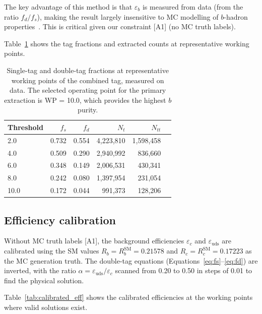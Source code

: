 \documentclass[11pt,a4paper]{article}
\begin{document}
The key advantage of this method is that $\varepsilon_b$ is measured from data (from
the ratio $f_d / f_s$), making the result largely insensitive to MC modelling of
$b$-hadron properties~\cite{ALEPH:Rb:1996, LEP:HF:2001}. This is critical given
our constraint [A1] (no MC truth labels).

Table~\ref{tab:working_points} shows the tag fractions and extracted counts at
representative working points.

\begin{table}[htbp]
\centering
\caption{Single-tag and double-tag fractions at representative working points of
the combined tag, measured on data. The selected operating point for the primary
extraction is WP = 10.0, which provides the highest $b$ purity.}
\label{tab:working_points}
\begin{tabular}{lrrrrr}
\toprule
Threshold & $f_s$ & $f_d$ & $N_t$ & $N_{tt}$ \\
\midrule
2.0 & 0.732 & 0.554 & 4,223,810 & 1,598,458 \\
4.0 & 0.509 & 0.290 & 2,940,992 & 836,660 \\
6.0 & 0.348 & 0.149 & 2,006,531 & 430,341 \\
8.0 & 0.242 & 0.080 & 1,397,954 & 231,054 \\
10.0 & 0.172 & 0.044 & 991,373 & 128,206 \\
\bottomrule
\end{tabular}
\end{table}

\subsection{Efficiency calibration}
\label{sec:calibration}

Without MC truth labels [A1], the background efficiencies $\varepsilon_c$ and
$\varepsilon_\mathrm{uds}$ are calibrated using the SM values $R_b = R_b^\mathrm{SM} = 0.21578$
and $R_c = R_c^\mathrm{SM} = 0.17223$ as the MC generation truth. The double-tag
equations (Equations~\ref{eq:fs}--\ref{eq:fd}) are inverted, with the ratio
$\alpha = \varepsilon_\mathrm{uds} / \varepsilon_c$ scanned from 0.20 to 0.50 in
steps of 0.01 to find the physical solution.

Table~\ref{tab:calibrated_eff} shows the calibrated efficiencies at the working points
where valid solutions exist.
\end{document}
